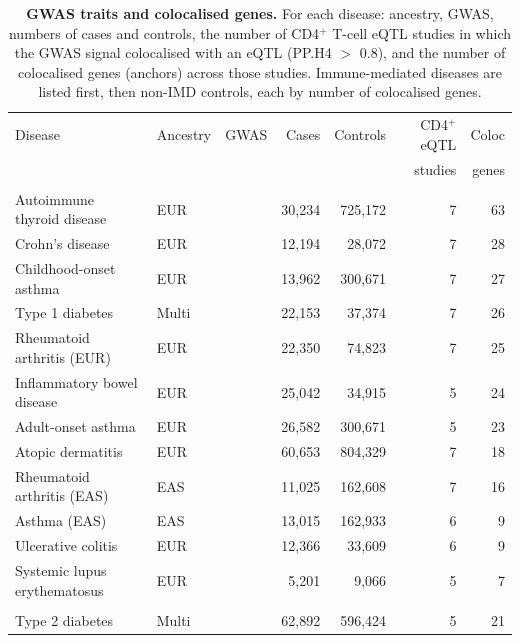 \begin{table}[tbp]
\centering
\caption[GWAS traits and colocalised genes]{\textbf{GWAS traits and colocalised genes.} For each disease: ancestry, GWAS, numbers of cases and controls, the number of CD4$^+$ T-cell eQTL studies in which the GWAS signal colocalised with an eQTL (PP.H4 $>$ 0.8), and the number of colocalised genes (anchors) across those studies. Immune-mediated diseases are listed first, then non-IMD controls, each by number of colocalised genes.}
\label{tab:traits}
\vspace{4pt}
\small
\setlength{\tabcolsep}{4pt}
\begin{tabularx}{\linewidth}{@{}>{\raggedright\arraybackslash}X l l r r r r@{}}
\toprule
Disease & Ancestry & GWAS & Cases & Controls & CD4$^+$ eQTL & Coloc \\
 & & & & & studies & genes \\
\midrule
\multicolumn{7}{@{}l}{\textit{Immune-mediated diseases}} \\
Autoimmune thyroid disease & EUR & \cite{saevarsdottir2020} & 30,234 & 725,172 & 7 & 63 \\
Crohn's disease & EUR & \cite{delange2017} & 12,194 & 28,072 & 7 & 28 \\
Childhood-onset asthma & EUR & \cite{ferreira2019} & 13,962 & 300,671 & 7 & 27 \\
Type 1 diabetes & Multi & \cite{robertson2021} & 22,153 & 37,374 & 7 & 26 \\
Rheumatoid arthritis (EUR) & EUR & \cite{ishigaki2022} & 22,350 & 74,823 & 7 & 25 \\
Inflammatory bowel disease & EUR & \cite{delange2017} & 25,042 & 34,915 & 5 & 24 \\
Adult-onset asthma & EUR & \cite{ferreira2019} & 26,582 & 300,671 & 5 & 23 \\
Atopic dermatitis & EUR & \cite{buduaggrey2023} & 60,653 & 804,329 & 7 & 18 \\
Rheumatoid arthritis (EAS) & EAS & \cite{ishigaki2022} & 11,025 & 162,608 & 7 & 16 \\
Asthma (EAS) & EAS & \cite{sakaue2021} & 13,015 & 162,933 & 6 & 9 \\
Ulcerative colitis & EUR & \cite{delange2017} & 12,366 & 33,609 & 6 & 9 \\
Systemic lupus erythematosus & EUR & \cite{bentham2015} & 5,201 & 9,066 & 5 & 7 \\
\addlinespace
\multicolumn{7}{@{}l}{\textit{Non-IMD controls}} \\
Type 2 diabetes & Multi & \cite{xue2018} & 62,892 & 596,424 & 5 & 21 \\

\end{tabularx}
\end{table}
